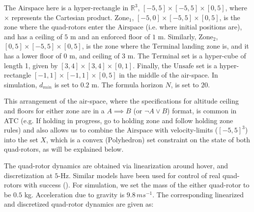 The $\text{Airspace}$ here is a hyper-rectangle in $\mathbb{R}^3$, $[-5,5] \times [-5,5] \times [0,5]$, where $\times$ represents the Cartesian product. $\text{Zone}_1$, $[-5,0] \times [-5,5] \times [0,5]$, is the zone where the quad-rotors enter the $\text{Airspace}$ (i.e. where initial positions are), and has a ceiling of $5$ m and an enforced floor of $1$ m. Similarly, $\text{Zone}_2$, $[0,5] \times [-5,5] \times [0,5]$, is the zone where the $\text{Terminal}$ landing zone is, and it has a lower floor of $0$ m, and ceiling of $3$ m. The $\text{Terminal}$ set is a hyper-cube of length 1, given by $[3,4] \times [3,4] \times [0,1]$. Finally, the $\text{Unsafe}$ set is a hyper-rectangle $[-1,1] \times [-1,1] \times [0,5]$ in the middle of the air-space. In simulation, $d_{min}$ is set to $0.2$ m. The formula horizon $N$, is set to $20$.

This arrangement of the air-space, where the specifications for altitude ceiling and floors for either zone are in a $A \implies B$ (or $ \neg A \lor B$) format, is common in ATC (e.g. If holding in progress, go to holding zone and follow holding zone rules) and also allows us to combine the $\text{Airspace}$ with velocity-limits ($[-5,5]^3$) into the set $X$, which is a convex (Polyhedron) set constraint on the state of both quad-rotors, as will be explained below.

The quad-rotor dynamics are obtained via linearization around hover, and discretization at $5$-Hz. Similar models have been used for control of real quad-rotors with success (\cite{RTSS15}). For simulation, we set the mass of the either quad-rotor to be $0.5$ kg. Acceleration due to gravity is $9.8\,ms^{-1}$. The corresponding linearized and discretized quad-rotor dynamics are given as:

